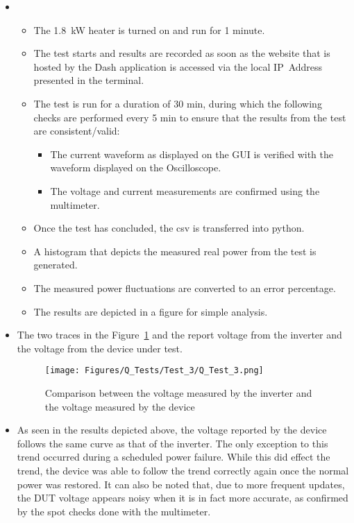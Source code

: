 \begin{itemize}
    \item [\emph{Steps followed in the test or experiment}]\mbox{}
    \begin{itemize}
        \item [Step 1:] The \qty{1.8}{\kW} heater is turned on and run for 1 minute.
        \item [Step 2:] The test starts and results are recorded as soon as the website that is hosted by the Dash application is accessed via the local IP~Address presented in the terminal.
        \item [Step 3:] The test is run for a duration of 30 min, during which the following checks are performed every 5 min to ensure that the results from the test are consistent/valid:
        \begin{itemize}
            \item The current waveform as displayed on the GUI is verified with the waveform displayed on the Oscilloscope.
            \item The voltage and current measurements are confirmed using the multimeter. 
        \end{itemize}
        \item[Step 4:] Once the test has concluded, the csv is transferred into python.
        \item[Step 5:] A histogram that depicts the measured real power from the test is generated.
        \item[Step 6:] The measured power fluctuations are converted to an error percentage.
        \item[Step 7:] The results are depicted in a figure for simple analysis.
    \end{itemize}
    \item [\emph{Results or measurements}]\mbox{}
    The two traces in the Figure~\ref{fig:Q_Test_3} and the report voltage from the inverter and the voltage from the device under test. 
    \begin{figure}[H]
        \centering
        \texttt{[image: Figures/Q\_Tests/Test\_3/Q\_Test\_3.png]}
        \caption{Comparison between the voltage measured by the inverter and the voltage measured by the device}
        \label{fig:Q_Test_3}
    \end{figure}
    \item [\emph{Observations}]\mbox{}
    As seen in the results depicted above, the voltage reported by the device follows the same curve as that of the inverter. The only exception to this trend occurred during a scheduled power failure. While this did effect the trend, the device was able to follow the trend correctly again once the normal power was restored. It can also be noted that, due to more frequent updates, the DUT voltage appears noisy when it is in fact more accurate, as confirmed by the spot checks done with the multimeter.  
    
\end{itemize}
